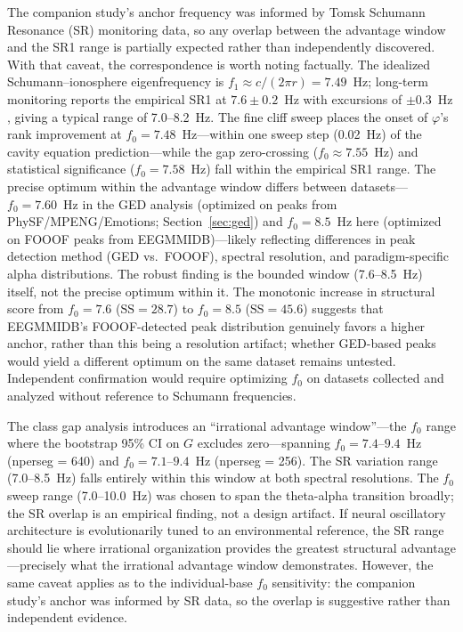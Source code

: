 \documentclass[11pt,a4paper]{article}
\newcommand{\phisym}{\varphi}
\newcommand{\fzero}{f_0}
\begin{document}
The companion study's anchor frequency was informed by Tomsk Schumann Resonance (SR) monitoring data, so any overlap between the advantage window and the SR1 range is partially expected rather than independently discovered. With that caveat, the correspondence is worth noting factually. The idealized Schumann--ionosphere eigenfrequency is $f_1 \approx c/(2\pi r) = 7.49$~Hz; long-term monitoring reports the empirical SR1 at $7.6 \pm 0.2$~Hz with excursions of $\pm 0.3$~Hz \parencite{nickolaenko2014schumann, lacy2026golden}, giving a typical range of 7.0--8.2~Hz. The fine cliff sweep places the onset of $\phisym$'s rank improvement at $\fzero = 7.48$~Hz---within one sweep step (0.02~Hz) of the cavity equation prediction---while the gap zero-crossing ($\fzero \approx 7.55$~Hz) and statistical significance ($\fzero = 7.58$~Hz) fall within the empirical SR1 range. The precise optimum within the advantage window differs between datasets---$\fzero = 7.60$~Hz in the GED analysis (optimized on peaks from PhySF/MPENG/Emotions; Section~\ref{sec:ged}) and $\fzero = 8.5$~Hz here (optimized on FOOOF peaks from EEGMMIDB)---likely reflecting differences in peak detection method (GED vs.\ FOOOF), spectral resolution, and paradigm-specific alpha distributions. The robust finding is the bounded window (7.6--8.5~Hz) itself, not the precise optimum within it. The monotonic increase in structural score from $\fzero = 7.6$ ($\text{SS} = 28.7$) to $\fzero = 8.5$ ($\text{SS} = 45.6$) suggests that EEGMMIDB's FOOOF-detected peak distribution genuinely favors a higher anchor, rather than this being a resolution artifact; whether GED-based peaks would yield a different optimum on the same dataset remains untested. Independent confirmation would require optimizing $\fzero$ on datasets collected and analyzed without reference to Schumann frequencies.

The class gap analysis introduces an ``irrational advantage window''---the $\fzero$ range where the bootstrap 95\% CI on $G$ excludes zero---spanning $\fzero = 7.4$--$9.4$~Hz (nperseg = 640) and $\fzero = 7.1$--$9.4$~Hz (nperseg = 256). The SR variation range (7.0--8.5~Hz) falls entirely within this window at both spectral resolutions. The $\fzero$ sweep range (7.0--10.0~Hz) was chosen to span the theta-alpha transition broadly; the SR overlap is an empirical finding, not a design artifact. If neural oscillatory architecture is evolutionarily tuned to an environmental reference, the SR range should lie where irrational organization provides the greatest structural advantage---precisely what the irrational advantage window demonstrates. However, the same caveat applies as to the individual-base $\fzero$ sensitivity: the companion study's anchor was informed by SR data, so the overlap is suggestive rather than independent evidence.
\end{document}

